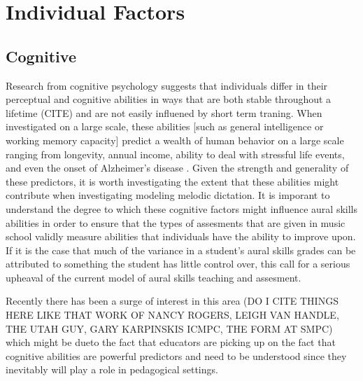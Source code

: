 \documentclass[]{book}
\theoremstyle{definition}
\theoremstyle{definition}
\theoremstyle{definition}
\theoremstyle{remark}
\begin{document}
\hypertarget{individual-factors}{%
\section{Individual Factors}\label{individual-factors}}

\hypertarget{cognitive}{%
\subsection{Cognitive}\label{cognitive}}

Research from cognitive psychology suggests that individuals differ in
their perceptual and cognitive abilities in ways that are both stable
throughout a lifetime (CITE) and are not easily influened by short term
traning. When investigated on a large scale, these abilities {[}such as
general intelligence or working memory capacity{]} predict a wealth of
human behavior on a large scale ranging from longevity, annual income,
ability to deal with stressful life events, and even the onset of
Alzheimer's disease
\citep{ritchieIntelligenceAllThat2015, unsworthAutomatedVersionOperation2005}.
Given the strength and generality of these predictors, it is worth
investigating the extent that these abilities might contribute when
investigating modeling melodic dictation. It is imporant to understand
the degree to which these cognitive factors might influence aural skills
abilities in order to ensure that the types of assesments that are given
in music school validly measure abilities that individuals have the
ability to improve upon. If it is the case that much of the variance in
a student's aural skills grades can be attributed to something the
student has little control over, this call for a serious upheaval of the
current model of aural skills teaching and assesment.

Recently there has been a surge of interest in this area (DO I CITE
THINGS HERE LIKE THAT WORK OF NANCY ROGERS, LEIGH VAN HANDLE, THE UTAH
GUY, GARY KARPINSKIS ICMPC, THE FORM AT SMPC) which might be dueto the
fact that educators are picking up on the fact that cognitive abilities
are powerful predictors and need to be understood since they inevitably
will play a role in pedagogical settings.
\end{document}
